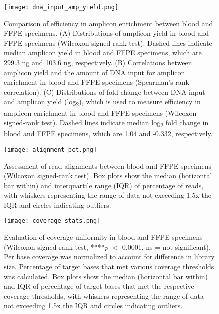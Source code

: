\begin{figure}[H]
	\centering
	\texttt{[image: dna\_input\_amp\_yield.png]}
	\caption[Comparison of efficiency in amplicon enrichment between blood and FFPE specimens.]{Comparison of efficiency in amplicon enrichment between blood and FFPE specimens. (A) Distributions of amplicon yield in blood and FFPE specimens (Wilcoxon signed-rank test). Dashed lines indicate median amplicon yield in blood and FFPE specimens, which are 299.3 ng and 103.6 ng, respectively. (B) Correlations between amplicon yield and the amount of DNA input for amplicon enrichment in blood and FFPE specimens (Spearman's rank correlation). (C) Distributions of fold change between DNA input and amplicon yield (log\textsubscript{2}), which is used to measure efficiency in amplicon enrichment in blood and FFPE specimens (Wilcoxon signed-rank test). Dashed lines indicate median log\textsubscript{2} fold change in blood and FFPE specimens, which are 1.04 and -0.332, respectively.}
	\label{fig:dna_input_amp_yield}
\end{figure}


\begin{figure}[H]
	\centering
	\texttt{[image: alignment\_pct.png]}
	\caption[Assessment of read alignments between blood and FFPE specimens (Wilcoxon signed-rank test).]{Assessment of read alignments between blood and FFPE specimens (Wilcoxon signed-rank test). Box plots show the median (horizontal bar within) and interquartile range (IQR) of percentage of reads, with whiskers representing the range of data not exceeding 1.5x the IQR and circles indicating outliers.}
	\label{fig:alignment_pct}
\end{figure}


\begin{figure}[H]
	\centering
	\texttt{[image: coverage\_stats.png]}
	\caption[Evaluation of coverage uniformity in blood and FFPE specimens (Wilcoxon signed-rank test, ****\textit{p} $<$ 0.0001, ns = not significant).]{Evaluation of coverage uniformity in blood and FFPE specimens (Wilcoxon signed-rank test, ****\textit{p} $<$ 0.0001, ns = not significant). Per base coverage was normalized to account for difference in library size. Percentage of target bases that met various coverage thresholds was calculated. Box plots show the median (horizontal bar within) and IQR of percentage of target bases that met the respective coverage thresholds, with whiskers representing the range of data not exceeding 1.5x the IQR and circles indicating outliers.}
	\label{fig:coverage_stats}
\end{figure}

